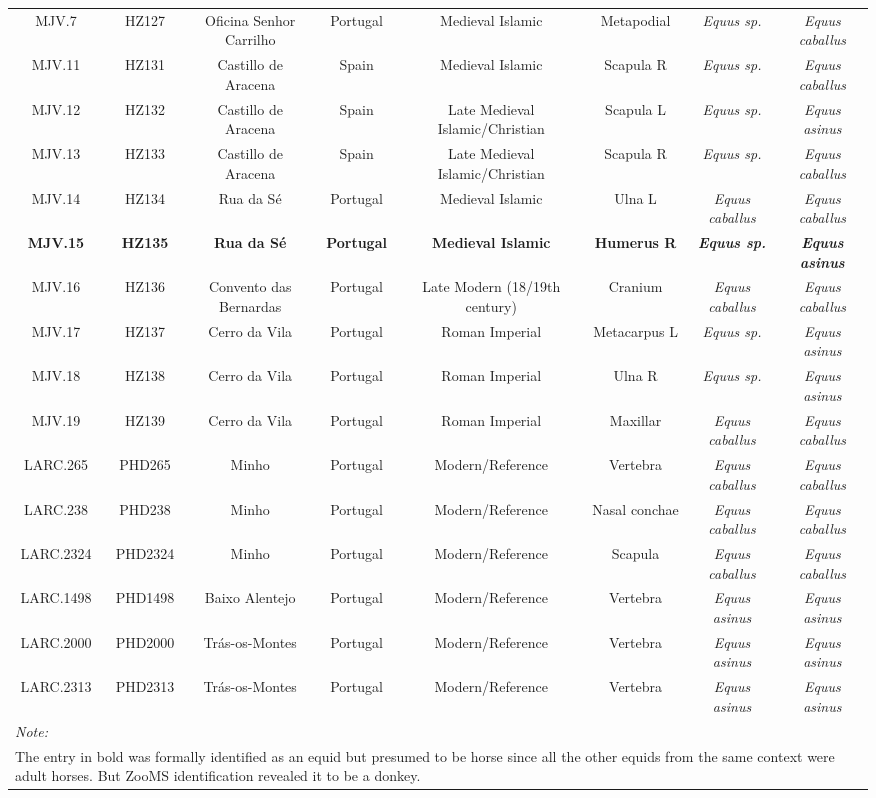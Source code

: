 \documentclass[preprint, 3p, authoryear]{elsarticle} %
\begin{document}
\begin{landscape}
\begin{table}
\begin{tabular}[t]{cccccc>{}c>{}c}
MJV.7 & HZ127 & Oficina Senhor Carrilho & Portugal & Medieval Islamic & Metapodial & \em{Equus {\normalfont sp.}} & \em{Equus caballus}\\
MJV.11 & HZ131 & Castillo de Aracena & Spain & Medieval Islamic & Scapula R & \em{Equus {\normalfont sp.}} & \em{Equus caballus}\\
MJV.12 & HZ132 & Castillo de Aracena & Spain & Late Medieval Islamic/Christian & Scapula L & \em{Equus {\normalfont sp.}} & \em{Equus asinus}\\
MJV.13 & HZ133 & Castillo de Aracena & Spain & Late Medieval Islamic/Christian & Scapula R & \em{Equus {\normalfont sp.}} & \em{Equus caballus}\\
MJV.14 & HZ134 & Rua da S\'{e} & Portugal & Medieval Islamic & Ulna L & \em{Equus caballus} & \em{Equus caballus}\\
\textbf{MJV.15} & \textbf{HZ135} & \textbf{Rua da S\'{e}} & \textbf{Portugal} & \textbf{Medieval Islamic} & \textbf{Humerus R} & \textbf{\em{Equus {\normalfont sp.}}} & \textbf{\em{Equus asinus}}\\
MJV.16 & HZ136 & Convento das Bernardas & Portugal & Late Modern (18/19th century) & Cranium & \em{Equus caballus} & \em{Equus caballus}\\
MJV.17 & HZ137 & Cerro da Vila & Portugal & Roman Imperial & Metacarpus L & \em{Equus {\normalfont sp.}} & \em{Equus asinus}\\
MJV.18 & HZ138 & Cerro da Vila & Portugal & Roman Imperial & Ulna R & \em{Equus {\normalfont sp.}} & \em{Equus asinus}\\
MJV.19 & HZ139 & Cerro da Vila & Portugal & Roman Imperial & Maxillar & \em{Equus caballus} & \em{Equus caballus}\\
LARC.265 & PHD265 & Minho & Portugal & Modern/Reference & Vertebra & \em{Equus caballus} & \em{Equus caballus}\\
LARC.238 & PHD238 & Minho & Portugal & Modern/Reference & Nasal conchae & \em{Equus caballus} & \em{Equus caballus}\\
LARC.2324 & PHD2324 & Minho & Portugal & Modern/Reference & Scapula & \em{Equus caballus} & \em{Equus caballus}\\
LARC.1498 & PHD1498 & Baixo Alentejo & Portugal & Modern/Reference & Vertebra & \em{Equus asinus} & \em{Equus asinus}\\
LARC.2000 & PHD2000 & Tr\'{a}s-os-Montes & Portugal & Modern/Reference & Vertebra & \em{Equus asinus} & \em{Equus asinus}\\
LARC.2313 & PHD2313 & Tr\'{a}s-os-Montes & Portugal & Modern/Reference & Vertebra & \em{Equus asinus} & \em{Equus asinus}\\
\bottomrule
\multicolumn{8}{l}{\rule{0pt}{1em}\textit{Note: }}\\
\multicolumn{8}{l}{\rule{0pt}{1em}The entry in bold was formally identified as an equid but presumed to be horse since all the other equids from the same context were adult horses. But ZooMS identification revealed it to be a donkey.}\\
\end{tabular}
\end{table}
\end{landscape}
\end{document}
